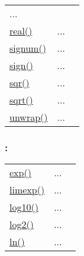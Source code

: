 \begin{tabular}{>{\raggedleft}p{3cm}>{\centering}p{0.5cm}l}
...&
 \begin{NoHyper} \nameref{par:rad2deg} \end{NoHyper}\tabularnewline
\textcolor{blue}{\hyperlink{real}{real()}}&
...&
 \begin{NoHyper} \nameref{par:Real} \end{NoHyper}\tabularnewline
\textcolor{blue}{\hyperlink{signum}{signum()}}&
...&
 \begin{NoHyper} \nameref{par:Signum} \end{NoHyper}\tabularnewline
\textcolor{blue}{\hyperlink{sign}{sign()}}&
...&
 \begin{NoHyper} \nameref{par:Sign} \end{NoHyper}\tabularnewline
\textcolor{blue}{\hyperlink{sqr}{sqr()}}&
...&
 \begin{NoHyper} \nameref{par:Square} \end{NoHyper}\tabularnewline
\textcolor{blue}{\hyperlink{sqrt}{sqrt()}}&
...&
 \begin{NoHyper} \nameref{par:Square-root} \end{NoHyper}\tabularnewline
\textcolor{blue}{\hyperlink{unwrap}{unwrap()}}&
...&
 \begin{NoHyper} \nameref{par:Unwrap} \end{NoHyper}\tabularnewline
\end{tabular}


\subsubsection*{: }

\textcolor{blue}{}\begin{tabular}{>{\raggedleft}p{3cm}>{\centering}p{0.5cm}l}
\textcolor{blue}{\hyperlink{exp}{exp()}}&
...&
 \begin{NoHyper} \nameref{par:Exponential-function} \end{NoHyper}\tabularnewline
\textcolor{blue}{\hyperlink{limexp}{limexp()}}&
...&
 \begin{NoHyper} \nameref{par:Limited-Exponential-function} \end{NoHyper}\tabularnewline
\textcolor{blue}{\hyperlink{log10}{log10()}}&
...&
 \begin{NoHyper} \nameref{par:Decimal-logarithm} \end{NoHyper}\tabularnewline
\textcolor{blue}{\hyperlink{log2}{log2()}}&
...&
 \begin{NoHyper} \nameref{par:Binary-logarithm} \end{NoHyper}\tabularnewline
\textcolor{blue}{\hyperlink{ln}{ln()}}&
...&
 \begin{NoHyper} \nameref{par:Natural-logarithm} \end{NoHyper}\tabularnewline
\end{tabular}



